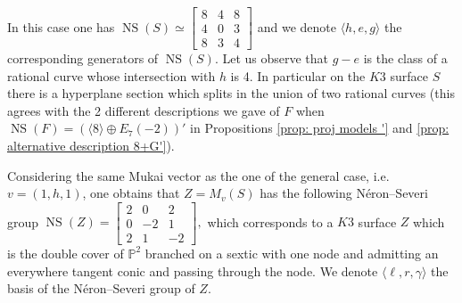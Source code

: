 \documentclass{amsart}
\theoremstyle{definition}
\numberwithin{equation}{section}
\numberwithin{equation}{section} \theoremstyle{definition}
\DeclareMathOperator{\NS}{NS}
\begin{document}
In this case one has $\NS(S)\simeq \left[\begin{array}{ccc}8&4&8\\4&0&3\\8&3&4\end{array}\right]$ and we denote $\langle h,e,g\rangle$ the corresponding generators of $\NS(S)$.
Let us observe that $g-e$ is the class of a rational curve whose intersection with $h$ is 4. In particular on the $K3$ surface $S$ there is a hyperplane section which splits in the union of two rational curves (this agrees with the 2 different descriptions we gave of $F$ when $\NS(F)=\left(\langle 8\rangle\oplus E_7(-2)\right)'$ in Propositions \ref{prop: proj models '} and \ref{prop: alternative description 8+G'}).

Considering the same Mukai vector as the one of the general case, i.e.~ $v=(1,h,1)$, one obtains that $Z=M_v(S)$ has the following N\'eron--Severi group $\NS(Z)=\left[\begin{array}{rrr}2&0&2\\0&-2&1\\2&1&-2\end{array}\right],$ which corresponds to a $K3$ surface $Z$ which is the double cover of $\mathbb{P}^2$ branched on a sextic with one node and admitting an everywhere tangent conic and passing through the node. We denote $\langle \ell, r,\gamma\rangle$ the basis of the N\'eron--Severi group of $Z$.
\end{document}
